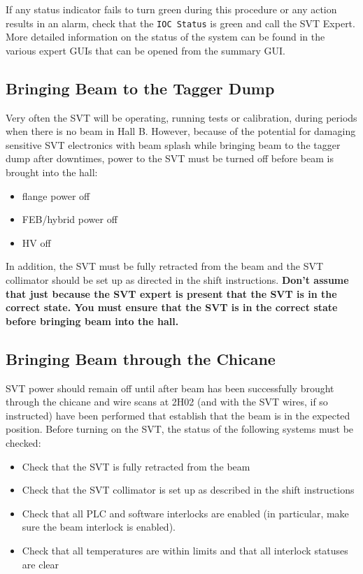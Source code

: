 \documentclass[12pt]{report}
\begin{document}
If any status indicator fails to turn green during this procedure or any action results in an alarm, check that the \texttt{IOC Status} is green and call the SVT Expert.  More detailed information on the status of the system can be found in the various expert GUIs that can be opened from the summary GUI.

\subsection{Bringing Beam to the Tagger Dump}
Very often the SVT will be operating, running tests or calibration, during periods when there is no beam in Hall B. However, because of the potential for damaging sensitive SVT electronics with beam splash while bringing beam to the tagger dump after downtimes, power to the SVT must be turned off before beam is brought into the hall:  
\begin{itemize}
\item flange power off
\item FEB/hybrid power off
\item HV off
\end {itemize}
In addition, the SVT must be fully retracted from the beam and the SVT collimator should be set up as directed in the shift instructions.  \textbf{Don't assume that just because the SVT expert is present that the SVT is in the correct state. You must ensure that the SVT is in the correct state before bringing beam into the hall.}

\subsection{Bringing Beam through the Chicane}
SVT power should remain off until after beam has been successfully brought through the chicane and wire scans at 2H02 (and with the SVT wires, if so instructed) have been performed that establish that the beam is in the expected position. Before turning on the SVT, the status of the following systems must be checked:

\begin{itemize}
\item Check that the SVT is fully retracted from the beam
\item Check that the SVT collimator is set up as described in the shift instructions
\item Check that all PLC and software interlocks are enabled (in particular, make sure the beam interlock is enabled).
\item Check that all temperatures are within limits and that all interlock statuses are clear
\end{itemize}
\end{document}
